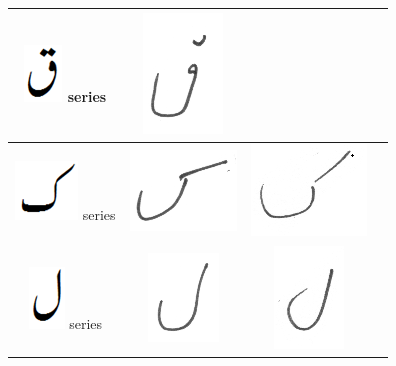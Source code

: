 \begin{table}[h]
\begin{tabular}{@{}cccc@{}}
\hline
\includegraphics[scale=0.20]{qaaf_orig} series & \includegraphics[scale=0.15]{202} & & \\
\hline
\includegraphics[scale=0.15]{kaaf_orig} series & \includegraphics[scale=0.15]{203} &
\includegraphics[scale=0.15]{204} & \\
\hline
\includegraphics[scale=0.15]{Laam_orig} series & \includegraphics[scale=0.15]{205} & \includegraphics[scale=0.15]{206} &  \\

\end{tabular}
\end{table}

